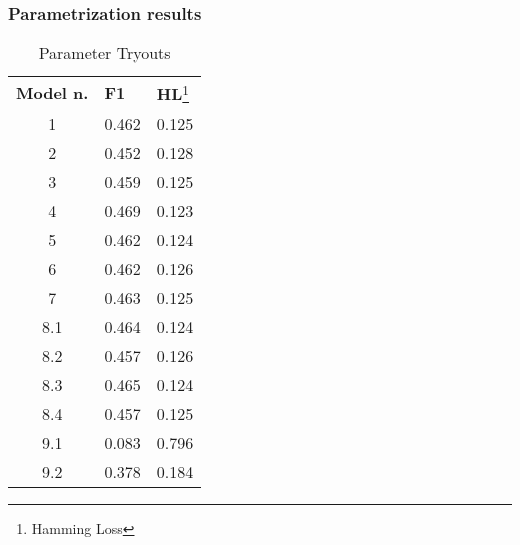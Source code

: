\begin{frame}
	\frametitle{Parametrization results}
	\begin{table}[]
\centering
\caption{Parameter Tryouts}
\label{my-label}
\begin{tabular}{cll}
\multicolumn{1}{l}{\textbf{Model n.}} & \textbf{F1} & \textbf{HL}\footnote{Hamming Loss} \\
1                                                & 0.462       & 0.125                 \\
2                                                & 0.452       & 0.128                 \\
3                                                & 0.459       & 0.125                 \\
4                                                & 0.469       & 0.123                 \\
5                                                & 0.462       & 0.124                 \\
6                                                & 0.462       & 0.126                 \\
7                                                & 0.463       & 0.125                 \\
8.1                                              & 0.464       & 0.124                 \\
8.2                                              & 0.457       & 0.126                 \\
8.3                                              & 0.465       & 0.124                 \\
8.4                                              & 0.457       & 0.125                 \\
9.1                                              & 0.083       & 0.796                 \\
9.2                                              & 0.378       & 0.184                
\end{tabular}
\end{table}
\end{frame}
